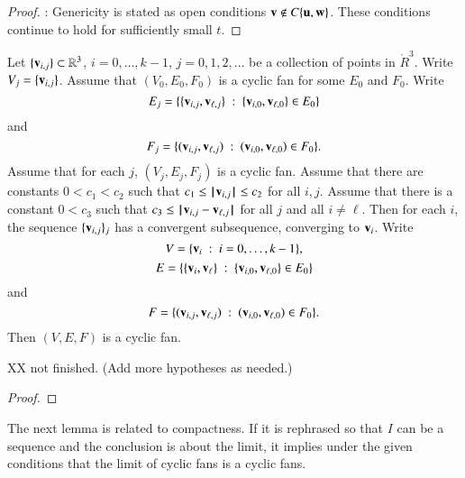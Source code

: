 \begin{proof}
: Genericity is stated as open conditions ${\mathbf v}\not\in C\{{\mathbf u},{\mathbf w}\}$.  These conditions continue to hold for sufficiently small $t$.
\end{proof}



\begin{lemma}\guid{}\label{lemma:cyclic-compact}
Let $\{{\mathbf v}_{i,j}\}\subset\mathbb{R}^3$, $i=0,\ldots,k-1$, $j=0,1,2,\ldots$ be a collection of points in $\ring{R}^3$. Write $V_j = \{{\mathbf v}_{i,j}\}$.  Assume that $(V_0,E_0,F_0)$ is a cyclic fan for some $E_0$ and $F_0$.  Write
$$E_j = \{\{{\mathbf v}_{i,j},{\mathbf v}_{\ell,j}\}\ :\  \{{\mathbf v}_{i,0},{\mathbf v}_{\ell,0}\}\in E_0\}$$ and
$$F_j = \{({\mathbf v}_{i,j},{\mathbf v}_{\ell,j})\ :\  ({\mathbf v}_{i,0},{\mathbf v}_{\ell,0})\in F_0\}.$$
Assume that for each $j$,  $(V_j,E_j,F_j)$ is a cyclic fan.
Assume that there are constants $0 < c_1 < c_2$ such that $c_1\le {{\hskip0.1em|\hskip-0.15em|\hskip0.1em}{\mathbf v}_{i,j}{\hskip0.1em|\hskip-0.15em|\hskip0.1em}}\le c_2$ for all $i,j$.
Assume that there is a constant $0<c_3$ such that $c_3\le{\hskip0.1em|\hskip-0.15em|\hskip0.1em}{\mathbf v}_{i,j} - {\mathbf v}_{\ell,j}{\hskip0.1em|\hskip-0.15em|\hskip0.1em}$ for all $j$ and all $i\ne \ell$.
Then for each $i$, the sequence $\{{\mathbf v}_{i,j}\}_j$ has a convergent subsequence, converging to ${\mathbf v}_i$.
Write
$$V = \{{\mathbf v}_i\ :\  i=0,\ldots,k-1\},$$
$$E = \{\{{\mathbf v}_{i},{\mathbf v}_{\ell}\}\ :\  \{{\mathbf v}_{i,0},{\mathbf v}_{\ell,0}\}\in E_0\}$$ and
$$F = \{({\mathbf v}_{i,j},{\mathbf v}_{\ell,j})\ :\  ({\mathbf v}_{i,0},{\mathbf v}_{\ell,0})\in F_0\}.$$
Then $(V,E,F)$ is a cyclic fan.

XX not finished. (Add more hypotheses as needed.)
\end{lemma}

\begin{proof}
\end{proof}

\begin{note}%
The next lemma is related to compactness.
If it is rephrased so that $I$ can be a sequence and the conclusion
is about the limit, it implies under the given conditions 
that the limit of cyclic fans is a cyclic fans.
\end{note}


